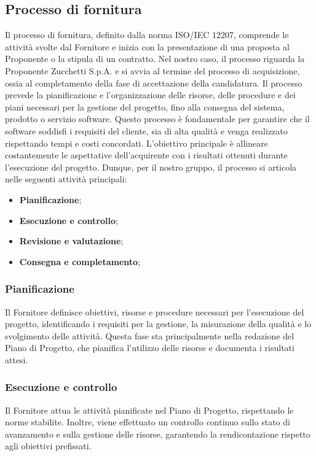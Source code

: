 \subsection{Processo di fornitura}
\label{subsection:processo_fornitura}
Il processo di fornitura, definito dalla norma ISO/IEC 12207, comprende le attività svolte dal Fornitore e inizia con la presentazione di una proposta al Proponente o la stipula di un contratto. Nel nostro caso, il processo riguarda la Proponente Zucchetti S.p.A. e si avvia al termine del processo di acquisizione, ossia al completamento della fase di accettazione della candidatura.
Il processo prevede la pianificazione e l’organizzazione delle risorse, delle procedure e dei piani necessari per la gestione del progetto, fino alla consegna del sistema, prodotto o servizio software. Questo processo è fondamentale per garantire che il software soddisfi i requisiti del cliente, sia di alta qualità e venga realizzato rispettando tempi e costi concordati. L’obiettivo principale è allineare costantemente le aspettative dell’acquirente con i risultati ottenuti durante l’esecuzione del progetto.
Dunque, per il nostro gruppo, il processo si articola nelle seguenti attività principali:
\begin{itemize}
    \item \textbf{Pianificazione};
    \item \textbf{Esecuzione e controllo};
    \item \textbf{Revisione e valutazione};
    \item \textbf{Consegna e completamento};
\end{itemize}

\subsubsection{Pianificazione}
Il Fornitore definisce obiettivi, risorse e procedure necessari per l’esecuzione del progetto, identificando i requisiti per la gestione, la misurazione della qualità e lo svolgimento delle attività. Questa fase sta principalmente nella redazione del Piano di Progetto, che pianifica l’utilizzo delle risorse e documenta i risultati attesi.

\subsubsection{Esecuzione e controllo}
Il Fornitore attua le attività pianificate nel Piano di Progetto, rispettando le norme stabilite. Inoltre, viene effettuato un controllo continuo sullo stato di avanzamento e sulla gestione delle risorse, garantendo la rendicontazione rispetto agli obiettivi prefissati. 

